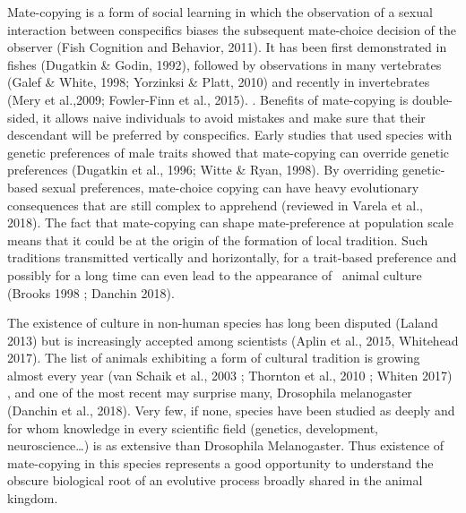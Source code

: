 \documentclass{article}
\begin{document}
Mate-copying is a form of social learning in which the observation of a sexual interaction between conspecifics biases the subsequent mate-choice decision of the observer (Fish Cognition and Behavior, 2011). It has been first demonstrated in fishes (Dugatkin \& Godin, 1992), followed by observations in many vertebrates (Galef \& White, 1998; Yorzinksi \& Platt, 2010) and recently in invertebrates (Mery et al.,2009; Fowler-Finn et al., 2015). . Benefits of mate-copying is double-sided, it allows naive individuals to avoid mistakes and make sure that their descendant will be preferred by conspecifics. Early studies that used species with genetic preferences of male traits showed that mate-copying can override genetic preferences (Dugatkin et al., 1996; Witte \& Ryan, 1998). By overriding genetic-based sexual preferences, mate-choice copying can have heavy evolutionary consequences that are still complex to apprehend (reviewed in Varela et al., 2018). The fact that mate-copying can shape mate-preference at population scale means that it could be at the origin of the formation of local tradition. Such traditions transmitted vertically and horizontally, for a trait-based preference and possibly for a long time can even lead to the appearance of \ animal culture (Brooks 1998 ; Danchin 2018).


\bigskip

The existence of culture in non-human species has long been disputed (Laland 2013) but is increasingly accepted among scientists (Aplin et al., 2015, Whitehead 2017). The list of animals exhibiting a form of cultural tradition is growing almost every year (van Schaik et al., 2003 ; Thornton et al., 2010 ; Whiten 2017) , and one of the most recent may surprise many, Drosophila melanogaster (Danchin et al., 2018). Very few, if none, species have been studied as deeply and for whom knowledge in every scientific field (genetics, development, neuroscience…) is as extensive than Drosophila Melanogaster. Thus existence of mate-copying in this species represents a good opportunity to understand the obscure biological root of an evolutive process broadly shared in the animal kingdom.


\bigskip
\end{document}
